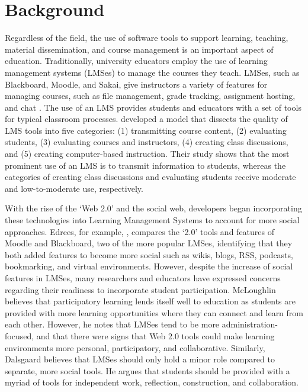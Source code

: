 \section{Background}

Regardless of the field, the use of software tools to support learning, teaching, material dissemination, and course management is an important aspect of education. Traditionally, university educators employ the use of learning management systems (LMSes) to manage the courses they teach. LMSes, such as Blackboard, Moodle, and Sakai, give instructors a variety of features for managing courses, such as file management, grade tracking, assignment hosting, and chat \cite{kumar2011comparative}. The use of an LMS provides students and educators with a set of tools for typical classroom processes. \cite{malikowski2007model} developed a model that dissects the quality of LMS tools into five categories: (1) transmitting course content, (2) evaluating students, (3) evaluating courses and instructors, (4) creating class discussions, and (5) creating computer-based instruction. Their study shows that the most prominent use of an LMS is to transmit information to students, whereas the categories of creating class discussions and evaluating students receive moderate and low-to-moderate use, respectively.

With the rise of the `Web 2.0' and the social web, developers began incorporating these technologies into Learning Management Systems to account for more social approaches. Edrees, for example, \cite{edrees2013elearning}, compares the `2.0' tools and features of Moodle and Blackboard, two of the more popular LMSes, identifying that they both added features to become more social such as wikis, blogs, RSS, podcasts, bookmarking, and virtual environments. However, despite the increase of social features in LMSes, many researchers and educators have expressed concerns regarding their readiness to incorporate student participation. McLoughlin \cite{mcloughlin2007social} believes that participatory learning lends itself well to education as students are provided with more learning opportunities where they can connect and learn from each other. However, he notes that LMSes tend to be more administration-focused, and that there were signs that Web 2.0 tools could make learning environments more personal, participatory, and collaborative. Similarly, Dalsgaard \cite{dalsgaard2006social} believes that LMSes should only hold a minor role compared to separate, more social tools. He argues that students should be provided with a myriad of tools for independent work, reflection, construction, and collaboration.

